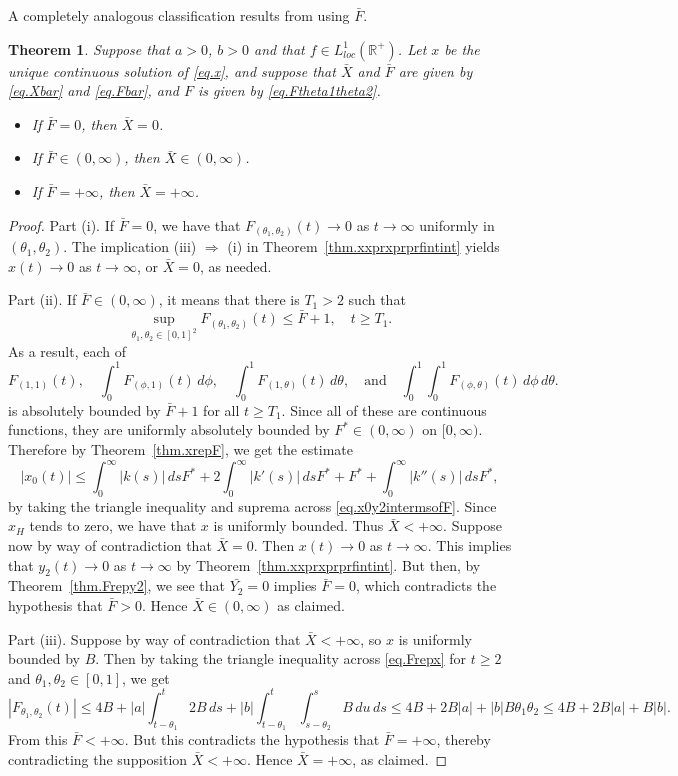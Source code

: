 \documentclass[10pt,reqno]{amsart}
\newtheorem{theorem}{Theorem}
\theoremstyle{definition}
\begin{document}
	A completely analogous classification results from using $\bar{F}$. 
	
	\begin{theorem}
		Suppose that $a>0$, $b>0$ and that $f\in L^1_{loc}(\mathbb{R}^+)$. Let $x$ be the unique continuous solution of \eqref{eq.x}, and suppose that $\bar{X}$ and $\bar{F}$ are given by \eqref{eq.Xbar} and \eqref{eq.Fbar}, and $F$ is given by \eqref{eq.Ftheta1theta2}.
		\begin{itemize}
			\item[(i)] If $\bar{F}=0$, then $\bar{X}=0$.
			\item[(ii)] If $\bar{F}\in (0,\infty)$, then $\bar{X}\in (0,\infty)$.
			\item[(iii)] If $\bar{F}=+\infty$, then  $\bar{X}=+\infty$.
		\end{itemize}
	\end{theorem}
	\begin{proof}
		Part (i). If $\bar{F}=0$, we have that $F_{(\theta_1,\theta_2)}(t)\to 0$ as $t\to\infty$ uniformly in $(\theta_1,\theta_2)$. The implication (iii) $\Rightarrow$ (i) in Theorem~\ref{thm.xxprxprprfintint} yields  $x(t)\to 0$ as $t\to\infty$, or $\bar{X}=0$, as needed.  
		
		Part (ii). If $\bar{F}\in (0,\infty)$, it means that there is $T_1>2$ such that 
		\[
		\sup_{\theta_1,\theta_2\in [0,1]^2} F_{(\theta_1,\theta_2)}(t) \leq \bar{F}+1, \quad t\geq T_1.
		\]
		As a result, each of 
		\[
		F_{(1,1)}(t), \quad 
		\int_0^1 F_{(\phi,1)}(t)\,d\phi, \quad \int_0^1 F_{(1,\theta)}(t)\,d\theta, \quad \text{and} \quad  \int_0^1	\int_0^1 F_{(\phi,\theta)}(t)\,d\phi \,d\theta. 
		\] 
		is absolutely bounded by $\bar{F}+1$ for all $t\geq T_1$. Since all of these are continuous functions, they are uniformly absolutely bounded by $F^\ast\in (0,\infty)$ on $[0,\infty)$. Therefore by Theorem~\ref{thm.xrepF}, we get the estimate
		\[
		|x_0(t)|\leq \int_0^\infty |k(s)|\,ds F^\ast+2\int_0^\infty |k'(s)|\,ds F^\ast+F^\ast+\int_0^\infty |k''(s)|\,ds F^\ast,
		\]
		by taking the triangle inequality and suprema across \eqref{eq.x0y2intermsofF}.
		Since $x_H$ tends to zero, we have that $x$ is uniformly bounded. Thus $\bar{X}<+\infty$. Suppose now by way of contradiction that $\bar{X}=0$. Then $x(t)\to 0$ as $t\to\infty$. This implies that $y_2(t)\to 0$ as $t\to\infty$ by Theorem~\ref{thm.xxprxprprfintint}. But then, by Theorem~\ref{thm.Frepy2}, we see that $\bar{Y_2}=0$ implies $\bar{F}=0$, which contradicts the hypothesis that $\bar{F}>0$. Hence $\bar{X}\in (0,\infty)$ as claimed.  
		
		Part (iii). Suppose by way of contradiction that $\bar{X}<+\infty$, so $x$ is uniformly bounded by $B$. Then by taking the triangle inequality across \eqref{eq.Frepx} for $t\geq 2$ and $\theta_1,\theta_2\in [0,1]$, we get 
		\[
		|F_{\theta_1,\theta_2}(t)|\leq 
		4B  
		+ |a| \int_{t-\theta_1}^t 2B \, ds + |b|\int_{t-\theta_1}^t \int_{s-\theta_2}^s B \, du \, ds
		\leq 4B+2B|a|+|b|B\theta_1\theta_2\leq 4B+2B|a|+B|b|.
		\]
		From this $\bar{F}<+\infty$. But this contradicts the hypothesis that $\bar{F}=+\infty$, thereby contradicting the supposition $\bar{X}<+\infty$. Hence $\bar{X}=+\infty$, as claimed. 
	\end{proof}	
\end{document}
